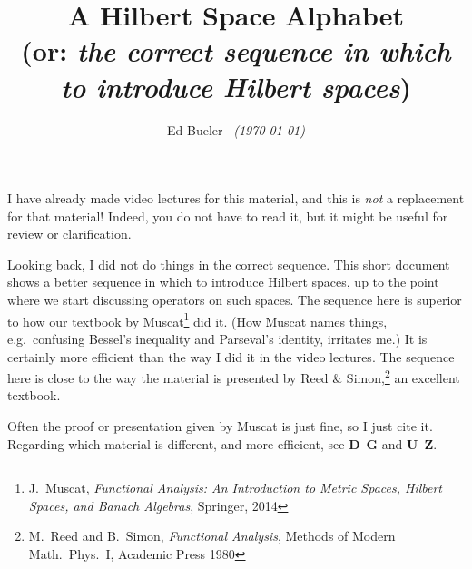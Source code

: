 \documentclass[11pt]{article}
\title{A Hilbert Space Alphabet \\ (or: \emph{the correct sequence in which to introduce Hilbert spaces})}
\author{\Large Ed Bueler \, {\small \emph{(\today)}}}
\date{}
\begin{document}
\maketitle

I have already made video lectures for this material, and this is \emph{not} a replacement for that material!  Indeed, you do not have to read it, but it might be useful for review or clarification.

Looking back, I did not do things in the correct sequence.  This short document shows a better sequence in which to introduce Hilbert spaces, up to the point where we start discussing operators on such spaces.  The sequence here is superior to how our textbook by Muscat\footnote{J.~Muscat, \emph{Functional Analysis: An Introduction to Metric Spaces, Hilbert Spaces, and Banach Algebras}, Springer, 2014} did it.  (How Muscat names things, e.g.~confusing Bessel's inequality and Parseval's identity, irritates me.)  It is certainly more efficient than the way I did it in the video lectures.  The sequence here is close to the way the material is presented by Reed \& Simon,\footnote{M.~Reed and B.~Simon, \emph{Functional Analysis}, Methods of Modern Math.~Phys.~I, Academic Press 1980} an excellent textbook.

Often the proof or presentation given by Muscat is just fine, so I just cite it.  Regarding which material is different, and more efficient, see \textbf{D}--\textbf{G} and \textbf{U}--\textbf{Z}.

\vspace{0.25in}
\end{document}
